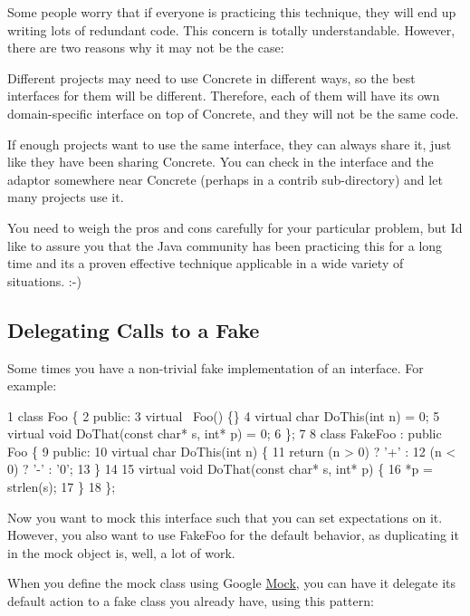 Some people worry that if everyone is practicing this technique, they will end up writing lots of redundant code. This concern is totally understandable. However, there are two reasons why it may not be the case\+:


\begin{DoxyItemize}
\item Different projects may need to use {\ttfamily Concrete} in different ways, so the best interfaces for them will be different. Therefore, each of them will have its own domain-\/specific interface on top of {\ttfamily Concrete}, and they will not be the same code.
\item If enough projects want to use the same interface, they can always share it, just like they have been sharing {\ttfamily Concrete}. You can check in the interface and the adaptor somewhere near {\ttfamily Concrete} (perhaps in a {\ttfamily contrib} sub-\/directory) and let many projects use it.
\end{DoxyItemize}

You need to weigh the pros and cons carefully for your particular problem, but I\textquotesingle{}d like to assure you that the Java community has been practicing this for a long time and it\textquotesingle{}s a proven effective technique applicable in a wide variety of situations. \+:-\/)

\subsection*{Delegating Calls to a Fake}

Some times you have a non-\/trivial fake implementation of an interface. For example\+:


\begin{DoxyCode}
1 class Foo \{
2  public:
3   virtual ~Foo() \{\}
4   virtual char DoThis(int n) = 0;
5   virtual void DoThat(const char* s, int* p) = 0;
6 \};
7 
8 class FakeFoo : public Foo \{
9  public:
10   virtual char DoThis(int n) \{
11     return (n > 0) ? '+' :
12         (n < 0) ? '-' : '0';
13   \}
14 
15   virtual void DoThat(const char* s, int* p) \{
16     *p = strlen(s);
17   \}
18 \};
\end{DoxyCode}


Now you want to mock this interface such that you can set expectations on it. However, you also want to use {\ttfamily Fake\+Foo} for the default behavior, as duplicating it in the mock object is, well, a lot of work.

When you define the mock class using Google \hyperlink{classMock}{Mock}, you can have it delegate its default action to a fake class you already have, using this pattern\+:



